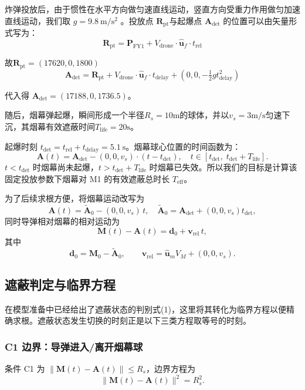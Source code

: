 \documentclass{ctexart}
\begin{document}
炸弹投放后，由于惯性在水平方向做匀速直线运动，竖直方向受重力作用做匀加速直线运动，我们取 $g = 9.8\ \mathrm{m/s^2}$ 。投放点 $\mathbf{R}_{\text{pt}}$与起爆点 $\mathbf{A}_{\text{det}}$ 的位置可以由矢量形式写为：
\[
\mathbf{R}_{\text{pt}} = \mathbf{P}_{\text{FY1}} + V_{\text{drone}} \cdot \hat{\mathbf{u}}_f \cdot t_{\text{rel}}
\]

故$\mathbf{R}_\text{pt}= (17620, 0, 1800) $
\[
\mathbf{A}_{\text{det}} = \mathbf{R}_{\text{pt}} + V_{\text{drone}} \cdot \hat{\mathbf{u}}_f \cdot t_{\text{delay}} + (0, 0, -\tfrac{1}{2} g t_{\text{delay}}^2)
\]

代入得 $\mathbf{A}_{\text{det}} = (17188, 0, 1736.5)$。

随后，烟幕弹起爆，瞬间形成一个半径$R_s=10\mathrm{m}$的球体，并以$v_s=3\mathrm{m/s}$匀速下沉，其烟幕有效遮蔽时间$T_\text{life}=20\mathrm{s}$。

起爆时刻 $t_{\text{det}} = t_{\text{rel}} + t_{\text{delay}} = 5.1\ \mathrm{s}$。烟幕球心位置的时间函数为：
\[
\mathbf{A}(t) = \mathbf{A}_{\text{det}} - (0, 0, v_s) \cdot (t - t_{\text{det}}), \quad t \in [t_{\text{det}},\; t_{\text{det}}+ T_{\text{life}}].
\]
$t < t_{\text{det}}$ 时烟幕尚未起爆，$t > t_{\text{det}} + T_{\text{life}}$ 时烟幕已失效。所以我们的目标是计算该固定投放参数下烟幕对 M1 的有效遮蔽总时长 $T_{\text{eff}}$。

为了后续求根方便，将烟幕运动改写为
\[
\mathbf{A}(t) = \tilde{\mathbf{A}}_0 - (0,0,v_s)\,t,\quad \tilde{\mathbf{A}}_0 = \mathbf{A}_{\text{det}} + (0,0,v_s)t_{\text{det}},
\]
同时导弹相对烟幕的相对运动为
\begin{equation}
\mathbf{M}(t)-\mathbf{A}(t)=\mathbf{d}_0 + \mathbf{v}_{\text{rel}}\,t,
\end{equation}
其中
\[
\mathbf{d}_0 = \mathbf{M}_0 - \tilde{\mathbf{A}}_0,\qquad
\mathbf{v}_{\text{rel}} = \hat{\mathbf{u}}_m V_M + (0,0,v_s).
\]

\subsection{遮蔽判定与临界方程}
在模型准备中已经给出了遮蔽状态的判别式(1)，这里将其转化为临界方程以便精确求根。遮蔽状态发生切换的时刻正是以下三类方程取等号的时刻。

\subsubsection{C1 边界：导弹进入/离开烟幕球}
条件 C1 为 $\|\mathbf{M}(t)-\mathbf{A}(t)\| \le R_s$，边界方程为
\[
\|\mathbf{M}(t)-\mathbf{A}(t)\|^2 = R_s^2.
\]
\end{document}
